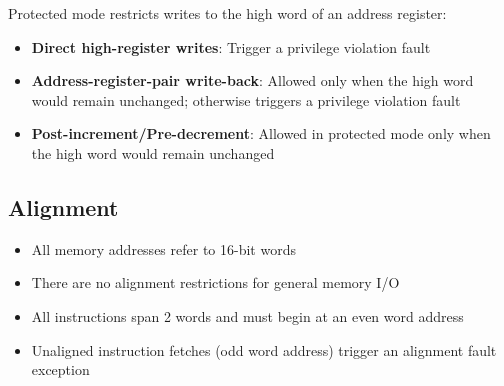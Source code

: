 Protected mode restricts writes to the high word of an address register:

\begin{itemize}
	\item \textbf{Direct high-register writes}: Trigger a privilege violation fault
	\item \textbf{Address-register-pair write-back}: Allowed only when the high word would remain unchanged; otherwise triggers a privilege violation fault
	\item \textbf{Post-increment/Pre-decrement}: Allowed in protected mode only when the high word would remain unchanged
\end{itemize}

\subsection{Alignment}

\begin{itemize}
	\item All memory addresses refer to 16-bit words
	\item There are no alignment restrictions for general memory I/O
	\item All instructions span 2 words and must begin at an even word address
	\item Unaligned instruction fetches (odd word address) trigger an alignment fault exception
\end{itemize}
